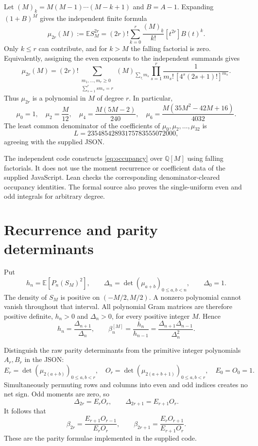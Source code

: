 \documentclass[11pt,a4paper]{article}
\newcommand{\E}{\mathbb E}
\begin{document}
Let $(M)_{\underline{k}}=M(M-1)\cdots(M-k+1)$ and $B=A-1$. Expanding $(1+B)^M$ gives the independent finite formula
\begin{equation}
\mu_{2r}(M):=\E S_M^{2r}
=(2r)!\sum_{k=0}^{r}\frac{(M)_{\underline{k}}}{k!}
[t^{2r}]B(t)^k.
\label{eq:occupancy}
\end{equation}
Only $k\leq r$ can contribute, and for $k>M$ the falling factorial is zero. Equivalently, assigning the even exponents to the independent summands gives
\[
\mu_{2r}(M)
=(2r)!\!
\sum_{\substack{m_1,\ldots,m_r\geq0\\\sum_{s=1}^r s m_s=r}}
(M)_{\underline{\sum_s m_s}}
\prod_{s=1}^r
\frac{1}{m_s!\,[4^s(2s+1)!]^{m_s}}.
\]
Thus $\mu_{2r}$ is a polynomial in $M$ of degree $r$. In particular,
\[
\mu_0=1,\quad \mu_2=\frac{M}{12},\quad
\mu_4=\frac{M(5M-2)}{240},\quad
\mu_6=\frac{M(35M^2-42M+16)}{4032}.
\]
The least common denominator of the coefficients of
$\mu_0,\mu_2,\ldots,\mu_{32}$ is
\[
L=23548542893175783555072000,
\]
agreeing with the supplied JSON.

The independent code constructs \eqref{eq:occupancy} over $\mathbb Q[M]$ using falling factorials. It does not use the moment recurrence or coefficient data of the supplied JavaScript. Lean checks the corresponding denominator-cleared occupancy identities. The formal source also proves the single-uniform even and odd integrals for arbitrary degree.

\section{Recurrence and parity determinants}
Put
\[
h_n=\E[P_n(S_M)^2],\qquad
\Delta_n=\det(\mu_{a+b})_{0\leq a,b<n},\qquad \Delta_0=1.
\]
The density of $S_M$ is positive on $(-M/2,M/2)$. A nonzero polynomial cannot vanish throughout that interval. All polynomial Gram matrices are therefore positive definite, $h_n>0$ and $\Delta_n>0$, for every positive integer $M$. Hence
\[
h_n=\frac{\Delta_{n+1}}{\Delta_n},\qquad
\beta_n^{[M]}=\frac{h_n}{h_{n-1}}
=\frac{\Delta_{n+1}\Delta_{n-1}}{\Delta_n^2}.
\]

Distinguish the raw parity determinants from the primitive integer polynomials $A_r,B_r$ in the JSON:
\[
E_r=\det(\mu_{2(a+b)})_{0\leq a,b<r},\quad
O_r=\det(\mu_{2(a+b+1)})_{0\leq a,b<r},\quad E_0=O_0=1.
\]
Simultaneously permuting rows and columns into even and odd indices creates no net sign. Odd moments are zero, so
\[
\Delta_{2r}=E_rO_r,\qquad \Delta_{2r+1}=E_{r+1}O_r.
\]
It follows that
\begin{equation}
\beta_{2r}=\frac{E_{r+1}O_{r-1}}{E_rO_r},
\qquad
\beta_{2r+1}=\frac{E_rO_{r+1}}{E_{r+1}O_r}.
\label{eq:parity}
\end{equation}
These are the parity formulae implemented in the supplied code.
\end{document}
